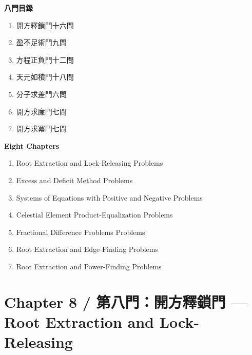 \documentclass[11pt,a4paper]{article}
\begin{document}
\vspace{0.5cm}

\begin{paracol}{2}
\begin{leftcolumn}
\noindent\textbf{八門目錄}

\begin{enumerate}[label=\arabic*.,noitemsep]
\item 開方釋鎖門\quad 十六問
\item 盈不足術門\quad 九問
\item 方程正負門\quad 十二問
\item 天元如積門\quad 十八問
\item 分子求差門\quad 六問
\item 開方求廉門\quad 七問
\item 開方求冪門\quad 七問
\end{enumerate}
\end{leftcolumn}

\switchcolumn

\noindent\textbf{Eight Chapters}

\begin{enumerate}[label=\arabic*.,noitemsep]
\item Root Extraction and Lock-Releasing Problems
\item Excess and Deficit Method Problems
\item Systems of Equations with Positive and Negative Problems
\item Celestial Element Product-Equalization Problems
\item Fractional Difference Problems Problems
\item Root Extraction and Edge-Finding Problems
\item Root Extraction and Power-Finding Problems
\end{enumerate}
\end{paracol}

\newpage

\section{Chapter 8 / 第八門：開方釋鎖門 --- Root Extraction and Lock-Releasing}
\label{sec:kaifang}
\end{document}
